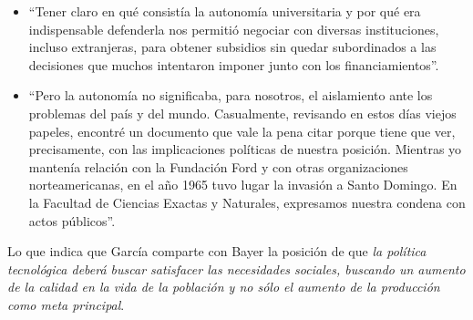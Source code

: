 \begin{itemize}
    \item ``Tener claro en qué consistía la autonomía universitaria y por qué era indispensable defenderla nos permitió negociar con diversas instituciones, incluso extranjeras, para obtener subsidios sin quedar subordinados a las decisiones que muchos intentaron imponer junto con los financiamientos''.
    \item ``Pero la autonomía no significaba, para nosotros, el aislamiento ante los problemas del país y del mundo. Casualmente, revisando en estos días viejos papeles, encontré un documento que vale la pena citar porque tiene que ver, precisamente, con las implicaciones políticas de nuestra posición. Mientras yo mantenía relación con la Fundación Ford y con otras organizaciones norteamericanas, en el año 1965 tuvo lugar la invasión a Santo Domingo. En la Facultad de Ciencias Exactas y Naturales, expresamos nuestra condena con actos públicos''.
\end{itemize}

Lo que indica que García comparte con Bayer la posición de que \textit{la política tecnológica deberá buscar satisfacer las necesidades sociales, buscando un aumento de la calidad en la vida de la población y no sólo el aumento de la producción como meta principal}.



